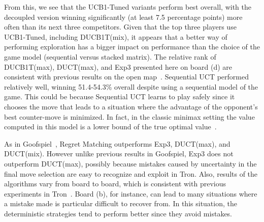 \documentclass{article}
\begin{document}
From this, we see that the UCB1-Tuned variants perform best overall, with the decoupled version 
winning significantly (at least 7.5 percentage points) more often than its next three competitors. 
Given that the top three players use UCB1-Tuned, including DUCB1T(mix), it appears that a better way of 
performing exploration has a bigger impact on performance than the choice of the game model 
(sequential versus stacked matrix).
The relative rank of DUCB1T(max), DUCT(max), and Exp3 presented here on board (d) are consistent with 
previous results on the open map~\cite{cig_paper}. 
Sequential UCT performed relatively well, winning 51.4-54.3\% overall despite using a 
sequential model of the game. 
This could be because Sequential UCT learns to play safely since it chooses the move that leads to a situation
where the advantage of the opponent's best counter-move is minimized. In fact, in the classic minimax setting the 
value computed in this model 
is a lower bound of the true optimal value~\cite{Bosansky13Using}. 

As in Goofspiel~\cite{mcts_goofspiel}, Regret Matching outperforms Exp3, DUCT(max), and DUCT(mix). 
However unlike previous results in Goofspiel, Exp3 does not outperform 
DUCT(max), possibly because mistakes caused by uncertainty in the final move selection are easy to recognize and exploit in Tron. 
Also, results of the algorithms vary from board to board, which is consistent with previous 
experiments in Tron~\cite{teuling_tron}. Board (b), for instance, can lead to many situations where 
a mistake made is particular difficult to recover from. In this situation, the deterministic strategies
tend to perform better since they avoid mistakes. 

\end{document}

